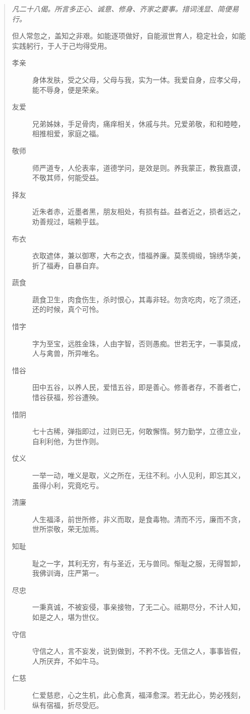 \begin{quotation}\it
    凡二十八偈。所言多正心、诚意、修身、齐家之要事。措词浅显、简便易行。

    但人常忽之，盖知之非艰。如能逐项做好，自能淑世育人，稳定社会，如能实践躬行，于人于己均得受用。

    \begin{adjustwidth}{-1em}{-1em}
        \begin{description}
            \item[孝亲] 身体发肤，受之父母，父母与我，实为一体。我爱自身，应孝父母，能不辱身，便是荣亲。
            \item[友爱] 兄弟姊妹，手足骨肉，痛痒相关，休戚与共。兄爱弟敬，和和睦睦，相推相爱，家庭之福。
            \item[敬师] 师严道专，人伦表率，道德学问，是效是则。养我蒙正，教我嘉谟，不敬其师，何能受益。
            \item[择友] 近朱者赤，近墨者黑，朋友相处，有损有益。益者近之，损者远之，劝善规过，端赖乎兹。
            \item[布衣] 衣取遮体，兼以御寒，大布之衣，惜福养廉。莫羡绸缎，锦绣华美，折了福寿，自暴自弃。
            \item[蔬食] 蔬食卫生，肉食伤生，杀时恨心，其毒非轻。勿贪吃肉，吃了须还，还的时候，真个可怜。
            \item[惜字] 字为至宝，远胜金珠，人由字智，否则愚痴。世若无字，一事莫成，人与禽兽，所异唯名。
            \item[惜谷] 田中五谷，以养人民，爱惜五谷，即是善心。修善者存，不善者亡，惜谷获福，殄谷遭殃。
            \item[惜阴] 七十古稀，弹指即过，过则已无，何敢懈惰。努力勤学，立德立业，自利利他，为世作则。
            \item[仗义] 一举一动，唯义是取，义之所在，无往不利。小人见利，即忘其义，虽得小利，究竟吃亏。
            \item[清廉] 人生福泽，前世所修，非义而取，是食毒物。清而不污，廉而不贪，世所崇敬，荣无加焉。
            \item[知耻] 耻之一字，其利无穷，有与圣近，无与兽同。惭耻之服，无得暂卸，我佛训诲，庄严第一。
            \item[尽忠] 一秉真诚，不被妄侵，事亲接物，了无二心。祗期尽分，不计人知，如是之人，堪为世仪。
            \item[守信] 守信之人，言不妄发，说到做到，不矜不伐。无信之人，事事皆假，人所厌弃，不如牛马。
            \item[仁慈] 仁爱慈悲，心之生机，此心愈真，福泽愈深。若无此心，势必残刻，纵有宿福，折尽受厄。

\end{description}
\end{adjustwidth}
\end{quotation}
